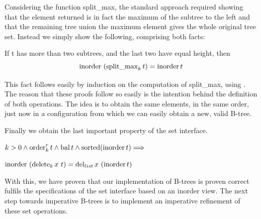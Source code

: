 Considering the function split\_max,
the standard approach required showing
that the element returned is in fact the maximum
of the subtree to the left
and that the remaining tree union the maximum element
gives the whole original tree set.
Instead we simply show the following,
comprising both facts:

\begin{lemma}
    \label{lem:splitmax-inorder}
    If t has more than two subtrees, and the last two have equal height, then
    \begin{equation*}
    \operatorname{inorder}\ (\operatorname{split\_max}_k t) = \operatorname{inorder} t
    \end{equation*}
\end{lemma}

This fact follows easily by induction on the computation of split\_max,
using .
The reason that these proofs follow so easily
is the intention behind the definition of both operations.
The idea is to obtain the same elements, in the same order,
just now in a configuration from which we can easily obtain
a new, valid B-tree.

Finally we obtain the last important property of the set interface.
\begin{theorem}
    $k > 0 \wedge \operatorname{order}^r_k t \wedge \operatorname{bal} t \wedge \operatorname{sorted}  (\operatorname{inorder} t)\Longrightarrow$\\
    \begin{center}
    $\operatorname{inorder}\ (\operatorname{delete}_k x\ t) = \operatorname{del}_{list} x\ (\operatorname{inorder} t)$
    \end{center}
\end{theorem}

With this, we have proven that 
our implementation of B-trees is proven correct
fulfils the specifications of the set interface based on an inorder view.
The next step towards imperative B-trees is to implement
an imperative refinement of these set operations.
